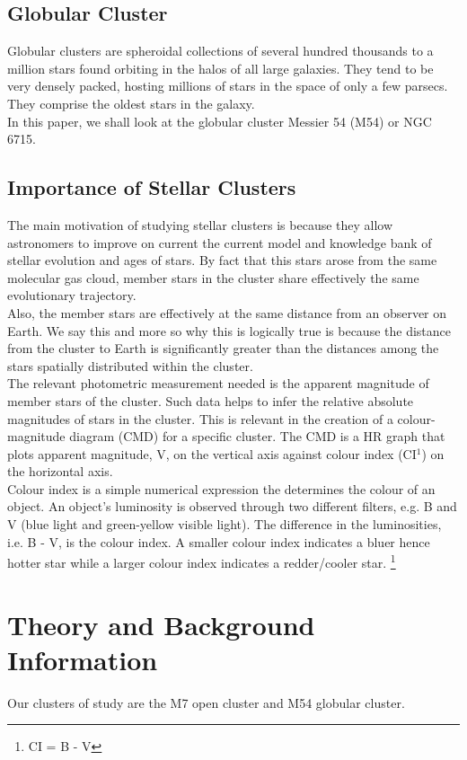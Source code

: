 \documentclass[12pt]{article}
\begin{document}
		\subsection{Globular Cluster}
		Globular clusters are spheroidal collections of several hundred thousands to a million stars found orbiting in the halos of all large galaxies. They tend to be very densely packed, hosting millions of stars in the space of only a few parsecs. They comprise the oldest stars in the galaxy.\\
		In this paper, we shall look at the globular cluster Messier 54 (M54) or NGC 6715.
		\subsection{Importance of Stellar Clusters}
		The main motivation of studying stellar clusters is because they allow astronomers to improve on current the current model and knowledge bank of stellar evolution and ages of stars. By fact that this stars arose from the same molecular gas cloud, member stars in the cluster share effectively the same evolutionary trajectory.\\
		Also, the member stars are effectively at the same distance from an observer on Earth. We say this and more so why this is logically true is because the distance from the cluster to Earth is significantly greater than the distances among the stars spatially distributed within the cluster.\\
		The relevant photometric measurement needed is the apparent magnitude of member stars of the cluster. Such data helps to infer the relative absolute magnitudes of stars in the cluster. This is relevant in the creation of a colour-magnitude diagram (CMD) for a specific cluster. The CMD is a HR graph that plots apparent magnitude, V, on the vertical axis against colour index (CI$^1$) on the horizontal axis.\\
		Colour index is a simple numerical expression the determines the colour of an object. An object's luminosity is observed through two different filters, e.g. B and V (blue light and green-yellow visible light). The difference in the luminosities, i.e. B - V, is the colour index. A smaller colour index indicates a bluer hence hotter star while a larger colour index indicates a redder/cooler star.
		\footnote{CI = B - V}
	
	
	
	\pagebreak
	\section{Theory and Background Information}
	Our clusters of study are the M7 open cluster and M54 globular cluster.
\end{document}
